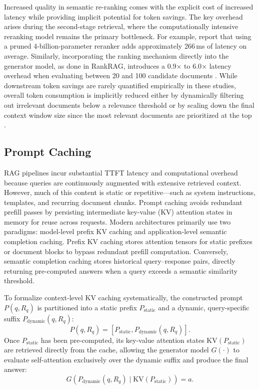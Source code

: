Increased quality in semantic re-ranking comes with the explicit cost of increased latency while providing implicit potential for token savings. The key overhead arises during the second-stage retrieval, where the computationally intensive reranking model remains the primary bottleneck. For example, \citet{moreira2024enhancing} report that using a pruned 4-billion-parameter reranker adds approximately 266\,ms of latency on average. Similarly, incorporating the ranking mechanism directly into the generator model, as done in RankRAG, introduces a 0.9$\times$ to 6.0$\times$ latency overhead when evaluating between 20 and 100 candidate documents \citep{yu2024rankrag}. While downstream token savings are rarely quantified empirically in these studies, overall token consumption is implicitly reduced either by dynamically filtering out irrelevant documents below a relevance threshold \citep{wang2025infogain} or by scaling down the final context window size since the most relevant documents are prioritized at the top \citep{yu2024rankrag}.


\subsection{Prompt Caching}
\label{lit:caching}

RAG pipelines incur substantial TTFT latency and computational overhead because queries are continuously augmented with extensive retrieved context. However, much of this content is static or repetitive---such as system instructions, templates, and recurring document chunks. Prompt caching avoids redundant prefill passes by persisting intermediate key-value (KV) attention states in memory for reuse across requests. Modern architectures primarily use two paradigms: model-level prefix KV caching and application-level semantic completion caching. Prefix KV caching stores attention tensors for static prefixes or document blocks to bypass redundant prefill computation. Conversely, semantic completion caching stores historical query--response pairs, directly returning pre-computed answers when a query exceeds a semantic similarity threshold.

To formalize context-level KV caching systematically, the constructed prompt $P(q, R_q)$ is partitioned into a static prefix $P_{\text{static}}$ and a dynamic, query-specific suffix $P_{\text{dynamic}}(q, R_q)$:
\begin{equation}
P(q, R_q) = [P_{\text{static}}, P_{\text{dynamic}}(q, R_q)].
\end{equation}
Once $P_{\text{static}}$ has been pre-computed, its key-value attention states $\text{KV}(P_{\text{static}})$ are retrieved directly from the cache, allowing the generator model $G(\cdot)$ to evaluate self-attention exclusively over the dynamic suffix and produce the final answer:
\begin{equation}
G(P_{\text{dynamic}}(q, R_q) \mid \text{KV}(P_{\text{static}})) = a.
\end{equation}

